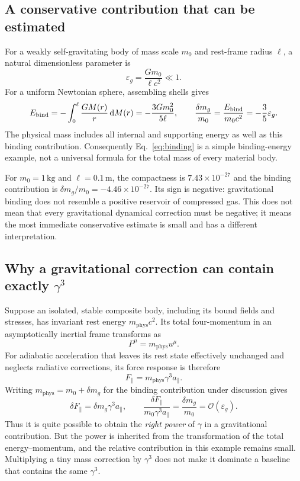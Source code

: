 \documentclass[11pt,a4paper]{article}
\numberwithin{equation}{section}
\newcommand{\dd}{\mathrm{d}}
\newcommand{\Ord}{\mathcal{O}}
\newcommand{\phys}{\mathrm{phys}}
\begin{document}
\subsection{A conservative contribution that can be estimated}

For a weakly self-gravitating body of mass scale $m_0$ and rest-frame radius $\ell$, a natural dimensionless parameter is
\begin{equation}
 \varepsilon_g=\frac{Gm_0}{\ell c^2}\ll1.
 \label{eq:compactness}
\end{equation}
For a uniform Newtonian sphere, assembling shells gives
\begin{equation}
 E_{\rm bind}=-\int_0^\ell\frac{G M(r)}{r}\,\dd M(r)
 =-\frac{3Gm_0^2}{5\ell},\qquad
 \frac{\delta m_g}{m_0}=\frac{E_{\rm bind}}{m_0c^2}
 =-\frac35\varepsilon_g.
 \label{eq:binding}
\end{equation}
The physical mass includes all internal and supporting energy as well as this binding contribution. Consequently Eq.~\eqref{eq:binding} is a simple binding-energy example, not a universal formula for the total mass of every material body.

For $m_0=1\,\mathrm{kg}$ and $\ell=0.1\,\mathrm m$, the compactness is $7.43\times10^{-27}$ and the binding contribution is $\delta m_g/m_0=-4.46\times10^{-27}$. Its sign is negative: gravitational binding does not resemble a positive reservoir of compressed gas. This does not mean that every gravitational dynamical correction must be negative; it means the most immediate conservative estimate is small and has a different interpretation.

\subsection{Why a gravitational correction can contain exactly \texorpdfstring{$\gamma^3$}{gamma cubed}}

Suppose an isolated, stable composite body, including its bound fields and stresses, has invariant rest energy $m_\phys c^2$. Its total four-momentum in an asymptotically inertial frame transforms as
\begin{equation}
 P^\mu=m_\phys u^\mu.
\end{equation}
For adiabatic acceleration that leaves its rest state effectively unchanged and neglects radiative corrections, its force response is therefore
\begin{equation}
 F_\parallel=m_\phys\gamma^3a_\parallel.
\end{equation}
Writing $m_\phys=m_0+\delta m_g$ for the binding contribution under discussion gives
\begin{equation}
 \delta F_\parallel=\delta m_g\gamma^3a_\parallel,
 \qquad
 \frac{\delta F_\parallel}{m_0\gamma^3a_\parallel}
 =\frac{\delta m_g}{m_0}=\Ord(\varepsilon_g).
 \label{eq:delta-force}
\end{equation}
Thus it is quite possible to obtain the \emph{right power} of $\gamma$ in a gravitational contribution. But the power is inherited from the transformation of the total energy--momentum, and the relative contribution in this example remains small. Multiplying a tiny mass correction by $\gamma^3$ does not make it dominate a baseline that contains the same $\gamma^3$.
\end{document}

